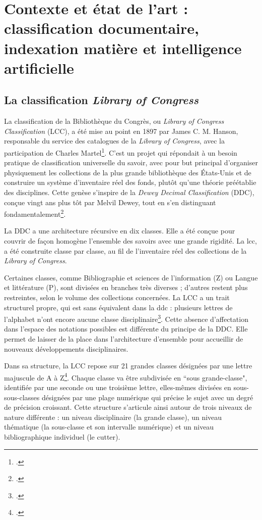 
\chapter{Contexte et état de l'art : classification documentaire, indexation matière et intelligence artificielle}
\label{chap:partie1}

\section{La classification \textit{Library of Congress}}
\label{sec:lcc-histoire}

La classification de la Bibliothèque du Congrès, ou \textit{Library of Congress Classification} (LCC), a été mise au point en 1897 par James C. M. Hanson, responsable du service des catalogues de la \textit{Library of Congress}, avec la participation de Charles Martel\footcite[p.~19-21]{chan1990}. C'est un projet qui répondait à un besoin pratique de classification universelle du savoir, avec pour but principal d'organiser physiquement les collections de la plus grande bibliothèque des États-Unis et de construire un système d'inventaire réel des fonds, plutôt qu'une théorie préétablie des disciplines. Cette genèse s'inspire de la \textit{Dewey Decimal Classification} (DDC), conçue vingt ans plus tôt par Melvil Dewey, tout en s'en distinguant fondamentalement\footcite[p.~20]{chan1990}.

La DDC a une architecture récursive en dix classes. Elle a été conçue pour couvrir de façon homogène l'ensemble des savoirs avec une grande rigidité. La \gls{lcc},  a été construite classe par classe, au fil de l'inventaire réel des collections de la \textit{Library of Congress}.

Certaines classes, comme Bibliographie et sciences de l'information (Z) ou Langue et littérature (P), sont divisées en branches très diverses ; d'autres restent plus restreintes, selon le volume des collections concernées. La LCC a un trait structurel propre, qui est sans équivalent dans la \gls{ddc} : plusieurs lettres de l'alphabet n'ont encore aucune classe disciplinaire\footcite{tacq2006}. Cette absence d'affectation dans l'espace des notations possibles est différente du principe de la DDC. Elle permet de laisser de la place dans l'architecture d'ensemble pour accueillir de nouveaux développements disciplinaires.

Dans sa structure, la LCC repose sur 21 grandes classes désignées par une lettre majuscule de A à Z\footcite[p.~38-41]{chan1990}. Chaque classe va être subdivisée en “sous grande-classe", identifiée par une seconde ou une troisième lettre, elles-mêmes divisées en sous-sous-classes désignées par une plage numérique qui précise le sujet avec un degré de précision croissant. Cette structure s'articule ainsi autour de trois niveaux de nature différente : un niveau disciplinaire (la grande classe), un niveau thématique (la sous-classe et son intervalle numérique) et un niveau bibliographique individuel (le cutter).

